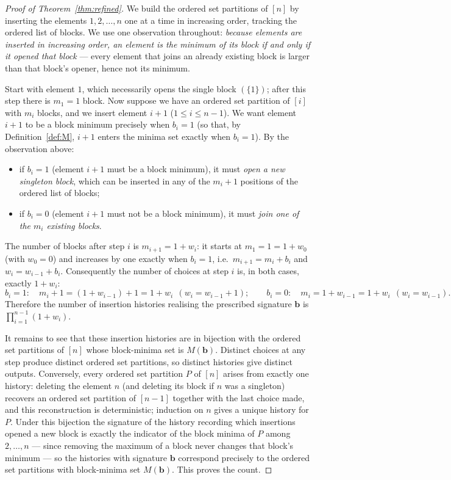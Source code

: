 \documentclass[11pt]{article}
\theoremstyle{definition}
\theoremstyle{remark}
\newcommand{\bit}{\mathbf{b}}
\begin{document}
\begin{proof}[Proof of Theorem~\ref{thm:refined}]
We build the ordered set partitions of $[n]$ by inserting the elements
$1,2,\dots,n$ one at a time in increasing order, tracking the ordered list of
blocks. We use one observation throughout: \emph{because elements are inserted
in increasing order, an element is the minimum of its block if and only if it
opened that block} --- every element that joins an already existing block is
larger than that block's opener, hence not its minimum.

Start with element $1$, which necessarily opens the single block $(\{1\})$;
after this step there is $m_1=1$ block. Now suppose we have an ordered set
partition of $[i]$ with $m_i$ blocks, and we insert element $i+1$
($1\le i\le n-1$). We want element $i+1$ to be a block minimum precisely when
$b_i=1$ (so that, by Definition~\ref{def:M}, $i+1$ enters the minima set exactly
when $b_i=1$). By the observation above:
\begin{itemize}
\item if $b_i=1$ (element $i+1$ must be a block minimum), it must \emph{open a
  new singleton block}, which can be inserted in any of the $m_i+1$ positions of
  the ordered list of blocks;
\item if $b_i=0$ (element $i+1$ must not be a block minimum), it must \emph{join
  one of the $m_i$ existing blocks}.
\end{itemize}
The number of blocks after step $i$ is $m_{i+1}=1+w_i$: it starts at
$m_1=1=1+w_0$ (with $w_0=0$) and increases by one exactly when $b_i=1$, i.e.\
$m_{i+1}=m_i+b_i$ and $w_i=w_{i-1}+b_i$. Consequently the number of choices at
step $i$ is, in both cases, exactly $1+w_i$:
\[
  b_i=1:\quad m_i+1=(1+w_{i-1})+1=1+w_i\ \ (w_i=w_{i-1}+1);\qquad
  b_i=0:\quad m_i=1+w_{i-1}=1+w_i\ \ (w_i=w_{i-1}).
\]
Therefore the number of insertion histories realising the prescribed
signature $\bit$ is $\prod_{i=1}^{n-1}(1+w_i)$.

It remains to see that these insertion histories are in bijection with the
ordered set partitions of $[n]$ whose block-minima set is $M(\bit)$. Distinct
choices at any step produce distinct ordered set partitions, so distinct
histories give distinct outputs. Conversely, every ordered set partition $P$ of
$[n]$ arises from exactly one history: deleting the element $n$ (and deleting its
block if $n$ was a singleton) recovers an ordered set partition of $[n-1]$
together with the last choice made, and this reconstruction is deterministic;
induction on $n$ gives a unique history for $P$. Under this bijection the
signature of the history recording which insertions opened a new block is exactly
the indicator of the block minima of $P$ among $2,\dots,n$ --- since removing the
maximum of a block never changes that block's minimum --- so the histories with
signature $\bit$ correspond precisely to the ordered set partitions with
block-minima set $M(\bit)$. This proves the count.
\end{proof}
\end{document}
